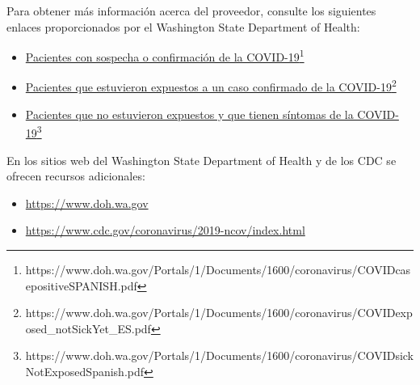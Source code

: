 \documentclass[10pt]{article}
\newcommand{\link}[2]{\href{#1}{#2}\footnote{#1}}
\begin{document}
Para obtener más información acerca del proveedor, consulte los siguientes
enlaces proporcionados por el Washington State Department of Health:

\begin{itemize}
\item

  \link{https://www.doh.wa.gov/Portals/1/Documents/1600/coronavirus/COVIDcasepositiveSPANISH.pdf}{Pacientes
  con sospecha o confirmación de la COVID-19}

\item

  \link{https://www.doh.wa.gov/Portals/1/Documents/1600/coronavirus/COVIDexposed\_notSickYet\_ES.pdf}{Pacientes
  que estuvieron expuestos a un caso confirmado de la COVID-19}

\item

  \link{https://www.doh.wa.gov/Portals/1/Documents/1600/coronavirus/COVIDsickNotExposedSpanish.pdf}{Pacientes
  que no estuvieron expuestos y que tienen síntomas de la COVID-19}

\end{itemize}

En los sitios web del Washington State Department of Health y de los CDC se
ofrecen recursos adicionales:

\begin{itemize}
\item

  \url{https://www.doh.wa.gov}

\item

  \url{https://www.cdc.gov/coronavirus/2019-ncov/index.html}

\end{itemize}
\end{document}
